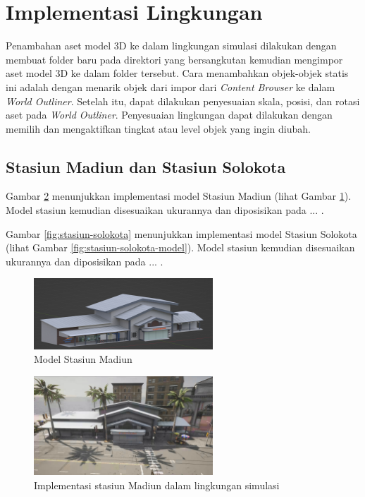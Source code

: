 \section{Implementasi Lingkungan}

Penambahan aset model 3D ke dalam lingkungan simulasi dilakukan dengan membuat
folder baru pada direktori yang bersangkutan kemudian mengimpor aset model 3D ke
dalam folder tersebut. Cara menambahkan objek-objek statis ini adalah dengan
menarik objek dari impor dari \textit{Content Browser} ke dalam \textit{World
Outliner}. Setelah itu, dapat dilakukan penyesuaian skala, posisi, dan rotasi
aset pada \textit{World Outliner}. Penyesuaian lingkungan dapat dilakukan dengan
memilih dan mengaktifkan tingkat atau level objek yang ingin diubah.


\subsection{Stasiun Madiun dan Stasiun Solokota}
Gambar \ref{fig:stasiun-madiun} menunjukkan implementasi model Stasiun Madiun
(lihat Gambar \ref{fig:stasiun-madiun-model}). Model stasiun kemudian
disesuaikan ukurannya dan diposisikan pada ... .

Gambar \ref{fig:stasiun-solokota} menunjukkan implementasi model Stasiun Solokota
(lihat Gambar \ref{fig:stasiun-solokota-model}). Model stasiun kemudian
disesuaikan ukurannya dan diposisikan pada ... .


\begin{figure}[ht]
    \centering
    \includegraphics[width=0.6\textwidth]{resources/chapter-3-stasiun-madiun-model.png}
    \caption{Model Stasiun Madiun}
    \label{fig:stasiun-madiun-model}
\end{figure}

\begin{figure}[ht]
    \centering
    \includegraphics[width=0.6\textwidth]{resources/chapter-4/stasiun-madiun-carla.png}
    \caption{Implementasi stasiun Madiun dalam lingkungan simulasi}
    \label{fig:stasiun-madiun}
\end{figure}

